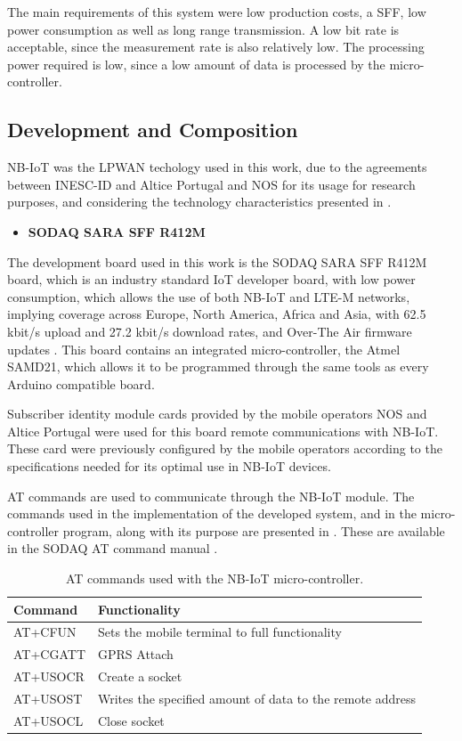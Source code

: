 The main requirements of this system were low production costs, a \ac{SFF}, low power consumption as well as long range transmission. A low bit rate is acceptable, since the measurement rate is also relatively low. The processing power required is low, since a low amount of data is processed by the micro-controller.

\subsection{Development and Composition}

NB-IoT was the LPWAN techology used in this work, due to the agreements between INESC-ID and Altice Portugal and NOS for its usage for research purposes, and considering the technology characteristics presented in .

\begin{itemize}[leftmargin=0.0mm]
  \item[] \textbf{SODAQ SARA SFF R412M}
\end{itemize}

\noindent
The development board used in this work is the SODAQ SARA SFF R412M board, which is an industry standard IoT developer board, with low power consumption, which allows the use of both NB-IoT and LTE-M networks, implying coverage across Europe, North America, Africa and Asia, with 62.5 kbit/s upload and 27.2 kbit/s download rates, and Over-The Air firmware updates \cite{U-blox}. This board contains an integrated micro-controller, the Atmel SAMD21, which allows it to be programmed through the same tools as every Arduino compatible board.

Subscriber identity module cards provided by the mobile operators NOS and Altice Portugal were used for this board remote communications with NB-IoT. These card were previously configured by the mobile operators according to the specifications needed for its optimal use in NB-IoT devices.

AT commands are used to communicate through the NB-IoT module. 
The commands used in the implementation of the developed system, and in the micro-controller program, along with its purpose are presented in . These are available in the SODAQ AT command manual \cite{U-Blox2018}.

\renewcommand\arraystretch{1.5}
\begin{table}[ht]
\centering
\caption{AT commands used with the NB-IoT micro-controller.}
\label{table:atCommands}
\begin{tabular}{l l} %
\toprule
Command&Functionality\\
\midrule
AT+CFUN&Sets the mobile terminal to full functionality\\
AT+CGATT&GPRS Attach\\
AT+USOCR&Create a socket\\
AT+USOST&Writes the specified amount of data to the remote address\\
AT+USOCL&Close socket\\
\bottomrule
\end{tabular}
\end{table}

